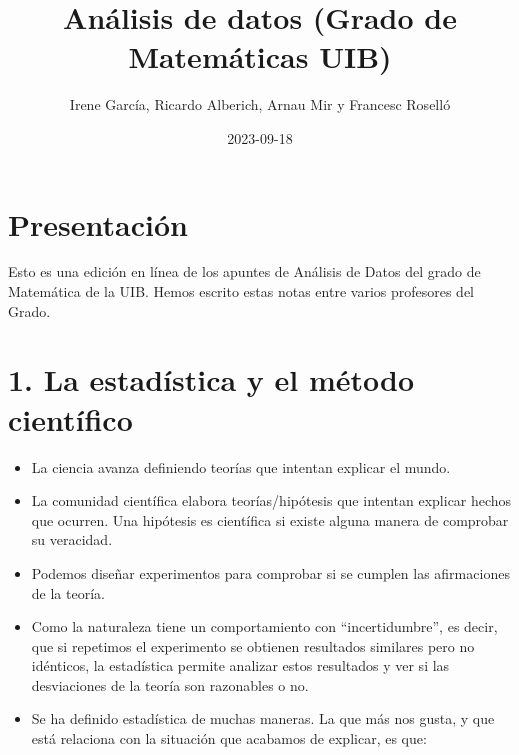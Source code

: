 \documentclass[
  letterpaper,
  DIV=11,
  numbers=noendperiod]{scrreprt}
\title{Análisis de datos (Grado de Matemáticas UIB)}
\author{Irene García, Ricardo Alberich, Arnau Mir y Francesc Roselló}
\date{2023-09-18}
\renewcommand*\contentsname{Tabla de contenidos}
\newcommand\contentsname{Tabla de contenidos}
\begin{document}
\maketitle
\ifdefined\Shaded\renewenvironment{Shaded}{\begin{tcolorbox}[frame hidden, enhanced, breakable, interior hidden, borderline west={3pt}{0pt}{shadecolor}, boxrule=0pt, sharp corners]}{\end{tcolorbox}}\fi

\renewcommand*\contentsname{Tabla de contenidos}
{
\hypersetup{linkcolor=}
\setcounter{tocdepth}{2}
\tableofcontents
}

\hypertarget{presentaciuxf3n}{%
\chapter*{Presentación}\label{presentaciuxf3n}}


Esto es una edición en línea de los apuntes de Análisis de Datos del
grado de Matemática de la UIB. Hemos escrito estas notas entre varios
profesores del Grado.


\hypertarget{la-estaduxedstica-y-el-muxe9todo-cientuxedfico}{%
\chapter{1. La estadística y el método
científico}\label{la-estaduxedstica-y-el-muxe9todo-cientuxedfico}}

\begin{itemize}
\item
  La ciencia avanza definiendo teorías que intentan explicar el mundo.
\item
  La comunidad científica elabora teorías/hipótesis que intentan
  explicar hechos que ocurren. Una hipótesis es científica si existe
  alguna manera de comprobar su veracidad.
\item
  Podemos diseñar experimentos para comprobar si se cumplen las
  afirmaciones de la teoría.
\item
  Como la naturaleza tiene un comportamiento con ``incertidumbre'', es
  decir, que si repetimos el experimento se obtienen resultados
  similares pero no idénticos, la estadística permite analizar estos
  resultados y ver si las desviaciones de la teoría son razonables o no.
\item
  Se ha definido estadística de muchas maneras. La que más nos gusta, y
  que está relaciona con la situación que acabamos de explicar, es que:
\end{itemize}
\end{document}
